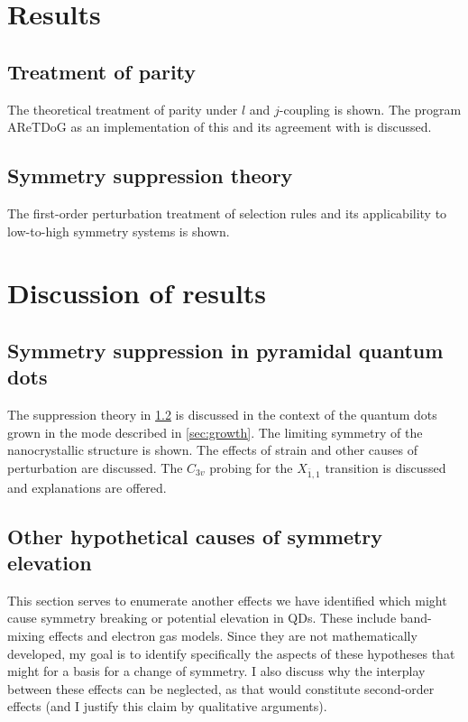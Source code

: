 \documentclass[12pt]{article}
\begin{document}
\section{Results}

\subsection{Treatment of parity}
The theoretical treatment of parity under $l$ and $j$-coupling is shown. The program AReTDoG as an implementation of this and its agreement with \cite{karlsson} is discussed.

\subsection{Symmetry suppression theory} \label{sec:suppression}
The first-order perturbation treatment of selection rules and its applicability to low-to-high symmetry systems is shown.

\section{Discussion of results}

\subsection{Symmetry suppression in pyramidal quantum dots}
The suppression theory in \ref{sec:suppression} is discussed in the context of the quantum dots grown in the mode described in \ref{sec:growth}. The limiting symmetry of the nanocrystallic structure is shown. The effects of strain and other causes of perturbation are discussed. The $C_{3v}$ probing for the $X_{\bar{1},1}$ transition is discussed and explanations are offered.

\subsection{Other hypothetical causes of symmetry elevation}
This section serves to enumerate another effects we have identified which might cause symmetry breaking or potential elevation in QDs. These include band-mixing effects and electron gas models. Since they are not mathematically developed, my goal is to identify specifically the aspects of these hypotheses that might for a basis for a change of symmetry. I also discuss why the interplay between these effects can be neglected, as that would constitute second-order effects (and I justify this claim by qualitative arguments).
\end{document}
